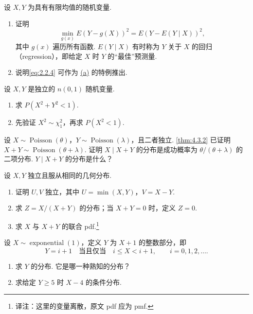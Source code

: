 \begin{exercise}\label{exercise:4.13}
设 $X,Y$ 为具有有限均值的随机变量.
\begin{enumerate}
\item[(a)]\label{itm:exercise:4.13:a} 证明
$$\min_{g(x)}E(Y-g(X))^2=E(Y-E(Y\mid X))^2,$$
其中 $g(x)$ 遍历所有函数. $E(Y\mid X)$ 有时称为 $Y$ 关于 $X$ 的回归（regression），即给定 $X$ 时 $Y$ 的“最佳”预测量.
\item[(b)] 说明\eqref{eq:2.2.4} 可作为 \hyperref[itm:exercise:4.13:a]{(a)} 的特例推出.
\end{enumerate}
\end{exercise}
\begin{exercise}\label{exercise:4.14}
设 $X,Y$ 是独立的 $n(0,1)$ 随机变量.
\begin{enumerate}
\item[(a)] 求 $P(X^2+Y^2<1)$.
\item[(b)] 先验证 $X^2\sim\chi_1^2$，再求 $P(X^2<1)$.
\end{enumerate}
\end{exercise}
\begin{exercise}\label{exercise:4.15}
设 $X\sim\operatorname{Poisson}(\theta)$，$Y\sim\operatorname{Poisson}(\lambda)$，且二者独立. \autoref{thm:4.3.2} 已证明 $X+Y\sim\operatorname{Poisson}(\theta+\lambda)$. 证明 $X\mid X+Y$ 的分布是成功概率为 $\theta/(\theta+\lambda)$ 的二项分布. $Y\mid X+Y$ 的分布是什么？
\end{exercise}
\begin{exercise}\label{exercise:4.16}
设 $X,Y$ 独立且服从相同的几何分布.
\begin{enumerate}
\item[(a)] 证明 $U,V$ 独立，其中 $U=\min(X,Y)$，$V=X-Y$.
\item[(b)] 求 $Z=X/(X+Y)$ 的分布；当 $X+Y=0$ 时，定义 $Z=0$.
\item[(c)] 求 $X$ 与 $X+Y$ 的联合 pdf.\footnote{译注：这里的变量离散，原文 pdf 应为 pmf.}
\end{enumerate}
\end{exercise}
\begin{exercise}\label{exercise:4.17}
设 $X\sim\operatorname{exponential}(1)$，定义 $Y$ 为 $X+1$ 的整数部分，即
$$Y=i+1\quad\text{当且仅当}\quad i\le X<i+1,\qquad i=0,1,2,\ldots.$$
\begin{enumerate}
\item[(a)] 求 $Y$ 的分布. 它是哪一种熟知的分布？
\item[(b)] 求给定 $Y\ge5$ 时 $X-4$ 的条件分布.
\end{enumerate}
\end{exercise}
